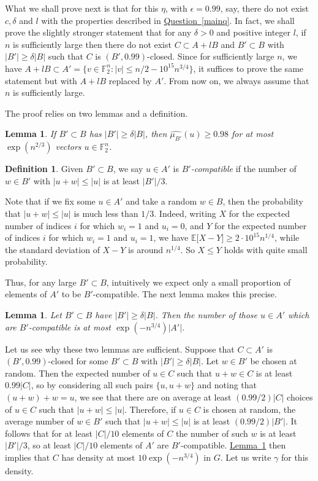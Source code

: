 \documentclass[11pt]{article}
\numberwithin{equation}{section}
\newtheorem{lemma}[theorem]{Lemma}
\theoremstyle{definition}
\newtheorem{definition}[theorem]{Definition}
\theoremstyle{plain}
\newcommand{\expref}[2]{\hyperref[#2]{#1~\ref{#2}}}
\newcommand\eps{\epsilon}  %
\newcommand\E{\mathbb{E}}
\newcommand\F{\mathbb{F}}
\newcommand\g{\gamma}
\renewcommand\d{\delta}
\newcommand \s{\subset}
\begin{document}
%
%
What we shall prove
next  %
is that for this $\eta$, with $\eps=0.99$, say, there do not exist $c,\d$ and $l$ with the properties described in \expref{Question}{mainq}. In fact, we shall prove the slightly stronger statement that for any $\delta>0$ and positive integer $l$, if $n$ is sufficiently large then there do not exist $C\subset A+lB$ and $B'\subset B$ with $|B'|\geq \d |B|$ such that $C$ is $(B',0.99)$-closed. Since for sufficiently large $n$, we have $A+lB\subset A'=\{v\in \F_2^n:|v|\leq n/2-10^{15}n^{3/4}\}$, it suffices to prove the same statement but with $A+lB$ replaced by $A'$. From now on, we always assume that $n$ is sufficiently large.

The proof relies on two lemmas and a definition.

\begin{lemma} \label{fourier}
	If $B'\subset B$ has $|B'|\geq \delta |B|$, then $\widehat{\mu_{B'}}(u)\geq 0.98$ for at most $\exp(n^{2/3})$ vectors $u\in \F_2^n$.
\end{lemma}

\begin{definition}
	Given $B'\subset B$, we say $u\in A'$ is \emph{$B'$-compatible} if the number of $w\in B'$ with $|u+w|\leq |u|$ is at least $|B'|/3$.
\end{definition}

Note that if we fix some $u\in A'$ and take a random $w\in B$, then the probability that $|u+w|\leq |u|$ is much less than $1/3$. Indeed, writing $X$ for the expected number of indices $i$ for which $w_i=1$ and $u_i=0$, and $Y$ for the expected number of indices $i$ for which $w_i=1$ and $u_i=1$, we have $\E\lbrack X-Y\rbrack\geq 2\cdot 10^{15}n^{1/4}$, while the standard deviation of $X-Y$ is around $n^{1/4}$. So $X\leq Y$ holds with quite small probability.

Thus, for any large $B'\s B$, intuitively we expect only a small proportion of elements of $A'$ to be $B'$-compatible. The next lemma makes this precise.

\begin{lemma} \label{compatible}
	Let $B'\subset B$ have $|B'|\geq\d|B|$. Then the number of those $u\in A'$ which are $B'$-compatible is at most $\exp(-n^{3/4})|A'|$.
\end{lemma}

\smallskip

\noindent Let us see why these two lemmas are sufficient. Suppose that $C\subset A'$ is $(B',0.99)$-closed for some $B'\subset B$ with $|B'|\geq \d|B|$. Let $w\in B'$ be chosen at random. Then the expected number of $u\in C$ such that $u+w\in C$ is at least $0.99|C|$, so by considering all such pairs $\{u,u+w\}$ and noting that $(u+w)+w=u$, we see that there are on average at least $({0.99}/2)|C|$ choices of $u\in C$ such that $|u+w|\leq|u|$. Therefore, if $u\in C$ is chosen at random, the average number of $w\in B'$ such that $|u+w|\leq|u|$ is at least $({0.99}/2)|B'|$. It follows that for at least $|C|/10$ elements of $C$ the number of such $w$ is at least $|B'|/3$, so at least $|C|/10$ elements of $A'$ are $B'$-compatible. \expref{Lemma}{compatible} then implies that $C$ has density at most $10\exp(-n^{3/4})$ in $G$. Let us write $\g$ for this density.
\end{document}
